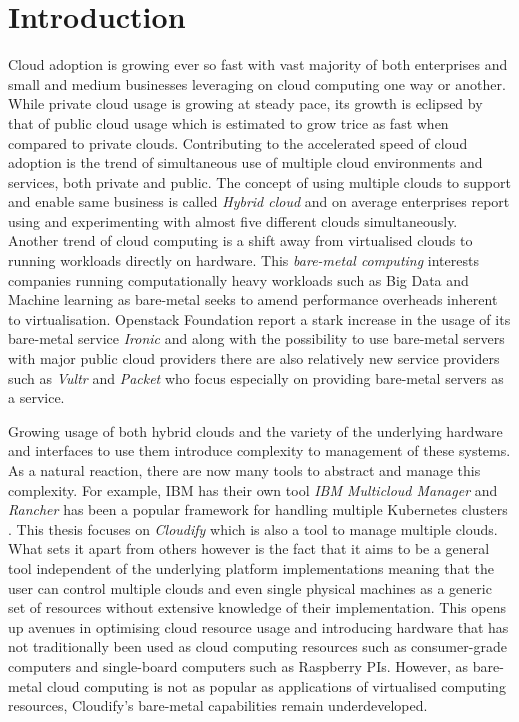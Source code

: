 \section{Introduction}

Cloud adoption is growing ever so fast with vast majority of both enterprises and small and medium businesses leveraging on cloud computing one way or another.\cite{stateofthecloud} While private cloud usage is growing at steady pace, its growth is eclipsed by that of public cloud usage which is estimated to grow trice as fast when compared to private clouds. 
Contributing to the accelerated speed of cloud adoption is the trend of simultaneous use of multiple cloud environments and services, both private and public. The concept of using multiple clouds to support and enable same business is called \textit{Hybrid cloud} and on average enterprises report using and experimenting with almost five different clouds simultaneously. 
Another trend of cloud computing is a shift away from virtualised clouds to running workloads directly on hardware. This \textit  {bare-metal computing} interests companies running computationally heavy workloads such as Big Data and Machine learning as bare-metal seeks to amend performance overheads inherent to virtualisation. Openstack Foundation report a stark increase in the usage of its bare-metal service \textit{Ironic} \cite{openstacksurvey} and along with the possibility to use bare-metal servers with major public cloud providers there are also relatively new service providers such as \textit{Vultr} \cite{vultr} and \textit{Packet} \cite{packet} who focus especially on providing bare-metal servers as a service.

Growing usage of both hybrid clouds and the variety of the underlying hardware and interfaces to use them introduce complexity to management of these systems. As a natural reaction, there are now many tools to abstract and manage this complexity. For example, IBM has their own tool \textit{IBM Multicloud Manager} \cite{ibmmulticloud} and \textit{Rancher} \cite{rancher} has been a popular framework for handling multiple Kubernetes clusters \cite{Kubernetes}. This thesis focuses on \textit{Cloudify} \cite{cloudify} which is also a tool to manage multiple clouds. What sets it apart from others however is the fact that it aims to be a general tool independent of the underlying platform implementations meaning that the user can control multiple clouds and even single physical machines as a generic set of resources without extensive knowledge of their implementation. This opens up avenues in optimising cloud resource usage and introducing hardware that has not traditionally been used as cloud computing resources such as consumer-grade computers and single-board computers such as Raspberry PIs. However, as bare-metal cloud computing is not as popular as applications of virtualised computing resources, Cloudify's bare-metal capabilities remain underdeveloped.

